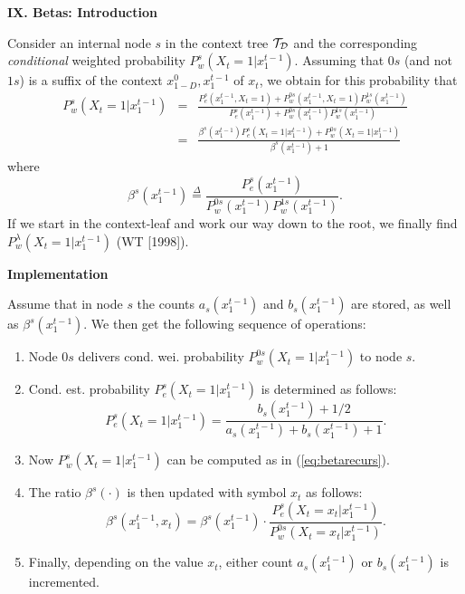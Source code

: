 \documentclass[a4paper,landscape]{slides} %
\newcommand{\define}{\stackrel{\Delta}{=}}
\newcommand{\xtm}{x_{1}^{t-1}}
\newcommand{\xpast}{x_{1-D}^{0}}
\newcommand{\cTD}{{\cal{T}_{D}}}
\begin{document}
\begin{slide}{\bf\Large\color{blue} IX. Betas: Introduction}

Consider an internal node $s$ in the context tree $\cTD$ and the corresponding {\em conditional} weighted probability $P_{w}^{s}(X_{t}=1|\xtm)$.
Assuming that $0s$ (and not $1s$) is a suffix of the context $\xpast,\xtm$ of $x_{t}$, we obtain for this probability that
\begin{eqnarray}
P_{w}^{s}(X_{t}=1|\xtm)
&=&\frac{ P_{e}^{s}(\xtm,X_{t}=1) + P_{w}^{0s}(\xtm,X_{t}=1) P_{w}^{1s}(\xtm) }
        { P_{e}^{s}(\xtm)         + P_{w}^{0s}(\xtm        ) P_{w}^{1s}(\xtm) }  \nonumber \\
&=&\frac{ \beta^{s}(\xtm) P_{e}^{s}(X_{t}=1|\xtm) + P_{w}^{0s}(X_{t}=1|\xtm) }
        { \beta^{s}(\xtm) + 1 } \label{eq:betarecurs}
\end{eqnarray}
where
\begin{equation}
\beta^{s}(\xtm) \define \frac{ P_{e}^{s}(\xtm) }{ P_{w}^{0s}(\xtm)P_{w}^{1s}(\xtm) }.\label{eq:betadef}
\end{equation}
If we start in the context-leaf and work our way down to the root, we finally find $P^{\lambda}_w(X_t=1|\xtm)$ (WT [1998]). 
\end{slide}
\begin{slide}{\bf\large\color{red} Implementation}

Assume that in node $s$ the counts $a_{s}(\xtm)$ and $b_{s}(\xtm)$ are stored, as well as $\beta^{s}(\xtm)$.
We then get the following sequence of operations:
\begin{enumerate}
\item\vspace{-10mm}
Node $0s$ delivers cond. wei. probability $P_{w}^{0s}(X_{t}=1|\xtm)$ to node $s$.
\item\vspace{-10mm}
Cond. est. probability $P_e^s(X_t=1|\xtm)$ is determined as follows:
\begin{equation}
P_{e}^{s}(X_{t}=1|\xtm) = \frac{b_{s}(\xtm)+1/2}{a_{s}(\xtm)+b_{s}(\xtm)+1}.\label{eq:Pecon}
\end{equation}
\item\vspace{-10mm}
Now $P_w^s(X_t=1|\xtm)$ can be computed as in (\ref{eq:betarecurs}).
\item\vspace{-10mm}
The ratio $\beta^{s}(\cdot)$ is then updated with symbol $x_{t}$ as follows:
\begin{equation}
\beta^{s}(\xtm,x_{t}) = \beta^{s}(\xtm) \cdot \frac{ P_{e}^{s} (X_{t}=x_{t}|\xtm) }{ P_{w}^{0s}(X_{t}=x_{t}|\xtm) }.
\label{eq:betaupd}
\end{equation}
\item\vspace{-10mm}
Finally, depending on the value $x_t$, either count $a_{s}(\xtm)$ or $b_{s}(\xtm)$ is incremented.
\end{enumerate}
\end{slide}
\end{document}
